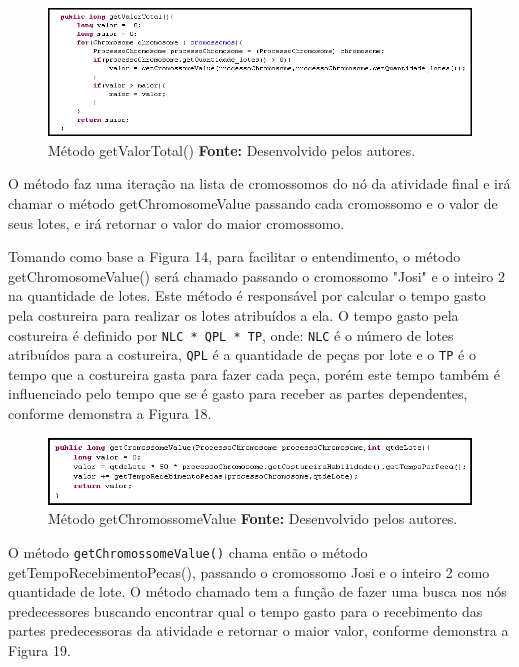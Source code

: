 \begin{figure}[h!]
	\centerline{\includegraphics[scale=0.8]{./imagens/metodo_getValorTotal.png}}
	\caption[Distribuição de trabalho]
	{Método getValorTotal() \textbf{Fonte:} Desenvolvido pelos autores.}
	\label{fig:exemplo1}
\end{figure}

\par O método faz uma iteração na lista de cromossomos do nó da atividade final e irá chamar o método getChromosomeValue passando 
cada cromossomo e o valor de seus lotes, e irá retornar o valor do maior cromossomo.

\par Tomando como base a Figura 14, para facilitar o entendimento, o método getChromosomeValue()
será chamado passando o cromossomo "Josi" e o inteiro 2 na quantidade de lotes. Este método é responsável por calcular o tempo gasto 
pela costureira para realizar os lotes atribuídos a ela. O tempo gasto pela
costureira é definido por \texttt{NLC * QPL * TP}, onde: \texttt{NLC} é o número
de lotes atribuídos para a costureira, \texttt{QPL} é a quantidade de peças por
lote e o \texttt{TP} é o tempo que a costureira gasta para fazer cada peça, porém este tempo também é influenciado pelo tempo que se é gasto para receber as partes dependentes, conforme demonstra a Figura 18.

\begin{figure}[h!]
	\centerline{\includegraphics[scale=0.8]{./imagens/metodo_getCromossomeValue.png}}
	\caption[Distribuição de trabalho]
	{Método getChromossomeValue \textbf{Fonte:} Desenvolvido pelos autores.}
	\label{fig:exemplo1}
\end{figure}

\par O método \texttt{getChromossomeValue()} chama então o método getTempoRecebimentoPecas(), passando o cromossomo Josi e 
o inteiro 2 como quantidade de lote. O método chamado tem a função de fazer uma busca nos nós predecessores buscando encontrar 
qual o tempo gasto para o recebimento das partes predecessoras da atividade e retornar o maior valor, conforme demonstra a Figura 19.

